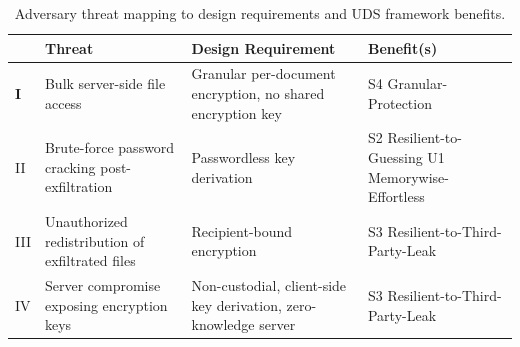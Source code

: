 \documentclass{article}
\begin{document}
\begin{table}[htbp]
    \centering
    \renewcommand{\arraystretch}{1.5} 
    \caption{Adversary threat mapping to design requirements and UDS framework benefits.}
    \label{tab:threat_mapping}
    \begin{tabularx}{\textwidth}{
        >{\bfseries\centering\arraybackslash}m{0.8cm} %
        >{\raggedright\arraybackslash}m{4.2cm}        %
        >{\raggedright\arraybackslash}m{4.2cm}        %
        >{\raggedright\arraybackslash}X               %
    }
        \toprule
        & \textbf{Threat} & \textbf{Design Requirement} & \textbf{Benefit(s)} \\
        \midrule
        
        I & Bulk server-side file access & Granular per-document encryption, no shared encryption key & S4 Granular-Protection \\
        
        \arrayrulecolor{gray!40}\midrule\arrayrulecolor{black} 
        
        II & Brute-force password cracking post-exfiltration & Passwordless key derivation & S2 Resilient-to-Guessing \newline U1 Memorywise-Effortless \\
        
        \arrayrulecolor{gray!40}\midrule\arrayrulecolor{black}
        
        III & Unauthorized redistribution of exfiltrated files & Recipient-bound encryption & S3 Resilient-to-Third-Party-Leak \\
        
        \arrayrulecolor{gray!40}\midrule\arrayrulecolor{black}
        
        IV & Server compromise exposing encryption keys & Non-custodial, client-side key derivation, zero-knowledge server & S3 Resilient-to-Third-Party-Leak \\
        
        \bottomrule
    \end{tabularx}
\end{table}
\end{document}
